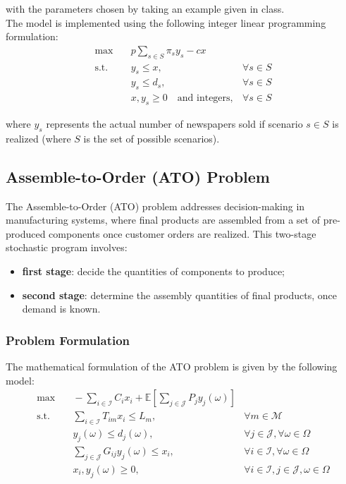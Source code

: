 \documentclass[a4paper,12pt]{article}
\begin{document}
	\noindent with the parameters chosen by taking an example given in class.\\
	
	\noindent The model is implemented using the following integer linear programming formulation:
	\[
	\begin{aligned}
		\max & \quad p \sum_{s \in S} \pi_s y_s - c x \\
		\text{s.t.} & \quad y_s \leq x, & \forall s \in S \\
		& \quad y_s \leq d_s, & \forall s \in S \\
		& \quad x, y_s \geq 0 \quad \text{and integers}, & \forall s \in S
	\end{aligned}
	\]
	
	\noindent	where \( y_s \) represents the actual number of newspapers sold if scenario \( s \in S\) is realized (where $S$ is the set of possible scenarios).
	
	\subsection{Assemble-to-Order (ATO) Problem} \label{ATO-formulation}
	
	The Assemble-to-Order (ATO) problem addresses decision-making in manufacturing systems, where final products are assembled from a set of pre-produced components once customer orders are realized. This two-stage stochastic program involves:
	\begin{itemize}
		\item \textbf{first stage}: decide the quantities of components to produce;
		\item \textbf{second stage}: determine the assembly quantities of final products, once demand is known.
	\end{itemize}
	
	\subsubsection{Problem Formulation}
	
	The mathematical formulation of the ATO problem is given by the following model:
	\[
	\begin{aligned}
		\max & \quad -\sum_{i \in \mathcal{I}} C_i x_i + \mathbb{E}\left[\sum_{j \in \mathcal{J}} P_j y_j(\omega)\right] \\
		\text{s.t.} & \quad \sum_{i \in \mathcal{I}} T_{im} x_i \leq L_m, & \forall m \in \mathcal{M} \\
		& \quad y_j(\omega) \leq d_j(\omega), & \forall j \in \mathcal{J}, \forall \omega \in \Omega \\
		& \quad \sum_{j \in \mathcal{J}} G_{ij} y_j(\omega) \leq x_i, & \forall i \in \mathcal{I}, \forall \omega \in \Omega \\
		& \quad x_i, y_j(\omega) \geq 0, & \forall i \in \mathcal{I}, j \in \mathcal{J}, \omega \in \Omega
	\end{aligned}
	\]
	
\end{document}
